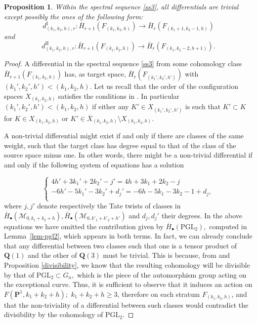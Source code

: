 \documentclass[10pt,a4paper,twoside]{amsart}
\theoremstyle{plain}
\newtheorem{prop}[theo]{Proposition}
\theoremstyle{definition}
\theoremstyle{remark}
\begin{document}
\begin{prop}\label{Diff} Within the spectral sequence  
\eqref{ss3}, all differentials are trivial except possibly the ones of the following form: 
\begin{equation}\label{d10}
d^{\text{I}}_{(k_1,k_2,h),r}: \bar{H}_{r+1}(F_{(k_1,k_2,h)})\rightarrow\bar{H}_{r}(F_{(k_1+1,k_2-1,h)})
\end{equation}
and 
\begin{equation}\label{d11}
d^{\text{II}}_{(k_1,k_2,h),r}: \bar{H}_{r+1}(F_{(k_1,k_2,h)})\rightarrow\bar{H}_{r}(F_{(k_1,k_2-2,h+1)}).
\end{equation}
\end{prop}
\begin{proof} 

A differential in the spectral sequence \eqref{ss3} from some cohomology class $\bar{H}_{r+1}(F_{(k_1,k_2,h)})$ has, as target space, $\bar{H}_{r}(F_{(k_1',k_2',h')})$ with $(k_1',k_2',h')<(k_1,k_2,h)$. Let us recall that the order of the configuration spaces $X_{(k_1,k_2,h)}$ satisfies the conditions in \cite[List 2.3]{TomM4}. In particular $(k_1',k_2',h')<(k_1,k_2,h)$ if either any $K'\in X_{(k_1',k_2',h')}$ is such that $K'\subset K$ for $K\in X_{(k_1,k_2,h)}$ or $K'\in \overline{X}_{(k_1,k_2,h)}\setminus X_{(k_1,k_2,h)}.$

A non-trivial differential might exist if and only if there are classes of the same weight, such that the target class has degree equal to that of the class of the source space minus one. In other words, there might be a non-trivial differential if and only if the following system of equations has a solution

\begin{equation}\label{system0}
\begin{cases}
4h'+3k_1'+2k_2'-j'=4h+3k_1+2k_2-j\\
-6h'-5k_1'-3k_2'+d_j'=-6h-5k_1-3k_2-1+d_j,\\
\end{cases}
\end{equation}
where $j,j'$ denote respectively the Tate twists of classes in $\bar{H}_\bullet(\mathcal{M}_{0,k_1+k_2+h}),\bar{H}_\bullet(\mathcal{M}_{0,k'_1+k'_2+h'})$ and $d_j,d_j'$ their degrees. In the above equations we have omitted the contribution given by $\bar{H}_\bullet(\mathrm{PGL}_2),$ computed in Lemma~\ref{lem-pgl2}, which appears in both terms.  In fact, we can already conclude that any differential between two classes such that one is a tensor product of $\mathbf{Q}(1)$ and the other of $\mathbf{Q}(3)$ must be trivial.
This is because, from \cite[Section 3.1]{TomM4} and Proposition \ref{divisibility}, we know that the resulting cohomology will be divisible by that of $\mathrm{PGL}_2\subset G_n,$ which is the piece of the automorphism group acting on the exceptional curve. Thus, it is sufficient to observe that it induces an action on $F(\mathbf{P}^1,k_1+k_2+h);$ $k_1+k_2+h\geq 3$, therefore on each stratum $F_{(k_1,k_2,h)}$, and that the non-triviality of a differential between such classes would contradict the divisibility by the cohomology of $\mathrm{PGL}_2$. 


\end{proof}
\end{document}
